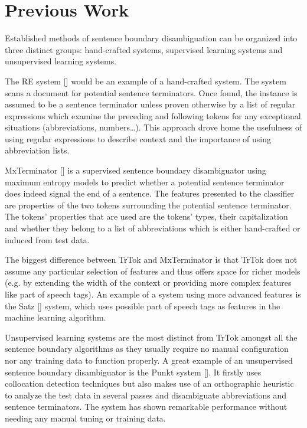 \section{Previous Work}
\label{sec:previous-work}

Established methods of sentence boundary disambiguation can be
organized into three distinct groups: hand-crafted systems, supervised
learning systems and unsupervised learning systems.

The RE system [] would be an example of a hand-crafted system. The
system scans a document for potential sentence terminators. Once
found, the instance is assumed to be a sentence terminator unless
proven otherwise by a list of regular expressions which examine the
preceding and following tokens for any exceptional situations
(abbreviations, numbers\ldots). This approach drove home the
usefulness of using regular expressions to describe context and the
importance of using abbreviation lists.

MxTerminator [] is a supervised sentence boundary disambiguator using
maximum entropy models to predict whether a potential sentence
terminator does indeed signal the end of a sentence. The features
presented to the classifier are properties of the two tokens
surrounding the potential sentence terminator. The tokens' properties
that are used are the tokens' types, their capitalization and whether
they belong to a list of abbreviations which is either hand-crafted or
induced from test data.

The biggest difference between TrTok and MxTerminator is that TrTok
does not assume any particular selection of features and thus offers
space for richer models (e.g. by extending the width of the context or
providing more complex features like part of speech tags). An example
of a system using more advanced features is the Satz [] system, which
uses possible part of speech tags as features in the machine learning
algorithm.

Unsupervised learning systems are the most distinct from TrTok amongst
all the sentence boundary algorithms as they usually require no manual
configuration nor any training data to function properly. A great
example of an unsupervised sentence boundary disambiguator is the
Punkt system []. It firstly uses collocation detection techniques but
also makes use of an orthographic heuristic to analyze the test data
in several passes and disambiguate abbreviations and sentence
terminators. The system has shown remarkable performance without
needing any manual tuning or training data.
